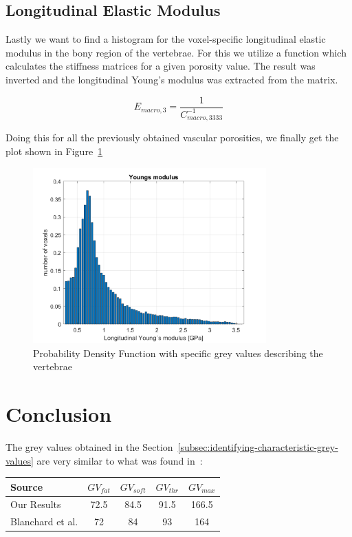 \documentclass[a4paper,12pt]{article}
\begin{document}
    \subsection{Longitudinal Elastic Modulus}\label{subsec:longitudinal-elastic-modulus}
    Lastly we want to find a histogram for the voxel-specific longitudinal elastic modulus in the bony region of the vertebrae.
    For this we utilize a function which calculates the stiffness matrices for a given porosity value.
    The result was inverted and the longitudinal Young's modulus was extracted from the matrix.

    \[
        E_{macro,3} = \frac{1}{C^{-1}_{macro,3333}}
    \]

    Doing this for all the previously obtained vascular porosities, we finally get the plot shown in Figure~\ref{fig:youngs_moduls}

    \begin{figure}[h]
        \centering
        \includegraphics[width=0.8\textwidth]{youngs_moduls}
        \caption{Probability Density Function with specific grey values describing the vertebrae}
        \label{fig:youngs_moduls}
    \end{figure}


    \section{Conclusion}\label{sec:conclusion}

    The grey values obtained in the Section~\ref{subsec:identifying-characteristic-grey-values} are very similar to what was found in~\cite{blanchard2016patient}:

    \begin{table}[h]
        \centering
        \begin{tabular}{lcccc}
            \hline
            \textbf{Source}  & $GV_{fat}$ & $GV_{soft}$ & $GV_{thr}$ & $GV_{max}$ \\
            \hline
            Our Results      & 72.5       & 84.5        & 91.5       & 166.5      \\
            Blanchard et al. & 72         & 84          & 93         & 164        \\
            \hline
        \end{tabular}
    \end{table}
\end{document}
